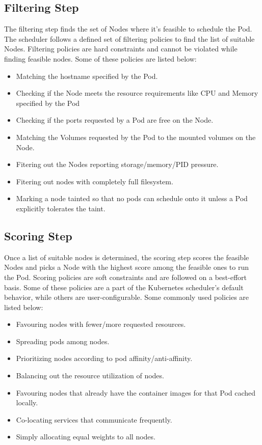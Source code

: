 \documentclass[sigconf]{acmart}
\begin{document}
\subsection{Filtering Step}
The filtering step finds the set of Nodes where it’s feasible to schedule the Pod. The scheduler follows a defined set of filtering policies to find the list of suitable Nodes. Filtering policies are hard constraints and cannot be violated while finding feasible nodes. Some of these policies are listed below:
\begin{itemize}
\item Matching the hostname specified by the Pod.
\item Checking if the Node meets the resource requirements like CPU and Memory specified by the Pod
\item Checking if the ports requested by a Pod are free on the Node.
\item Matching the Volumes requested by the Pod to the mounted volumes on the Node.
\item Fitering out the Nodes reporting storage/memory/PID pressure.
\item Fitering out nodes with completely full filesystem.
\item Marking a node tainted so that no pods can schedule onto it unless a Pod explicitly tolerates the taint.
\end{itemize}

\subsection{Scoring Step}
Once a list of suitable nodes is determined, the scoring step scores the feasible Nodes and picks a Node with the highest score among the feasible ones to run the Pod. Scoring policies are soft constraints and are followed on a best-effort basis. Some of these policies are a part of the Kubernetes scheduler’s default behavior, while others are user-configurable. Some commonly used policies are listed below:
\begin{itemize}
\item Favouring nodes with fewer/more requested resources.
\item Spreading pods among nodes.
\item Prioritizing nodes according to pod affinity/anti-affinity.
\item Balancing out the resource utilization of nodes.
\item Favouring nodes that already have the container images for that Pod cached locally.
\item Co-locating services that communicate frequently.
\item Simply allocating equal weights to all nodes.
\end{itemize}
\end{document}
